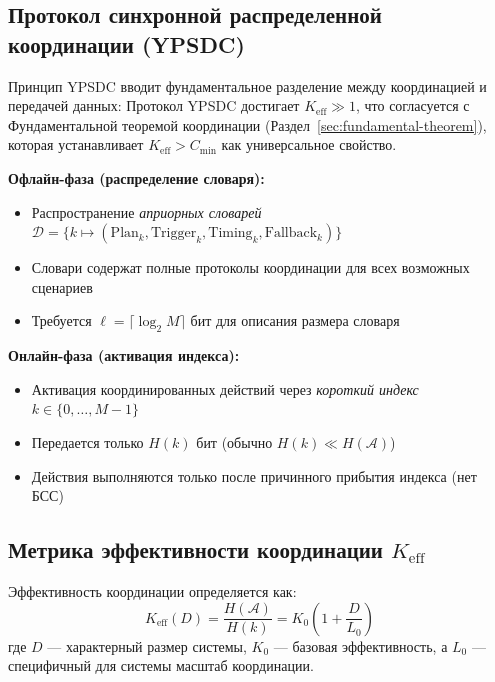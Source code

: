 \documentclass[11pt,a4paper]{article}
\begin{document}
	\subsection{Протокол синхронной распределенной координации (YPSDC)}
	Принцип YPSDC вводит фундаментальное разделение между координацией и передачей данных:
	Протокол YPSDC достигает $K_{\mathrm{eff}} \gg 1$, что согласуется с Фундаментальной теоремой координации (Раздел~\ref{sec:fundamental-theorem}), которая устанавливает $K_{\mathrm{eff}} > C_{\min}$ как универсальное свойство.
	\begin{tcolorbox}[title=Принцип YPSDC, colback=blue!5!white, colframe=blue!50!black]
		\textbf{Офлайн-фаза (распределение словаря):}
		\begin{itemize}
			\item Распространение \emph{априорных словарей} $\mathcal{D} = \{k \mapsto (\text{Plan}_k, \text{Trigger}_k, \text{Timing}_k, \text{Fallback}_k)\}$
			\item Словари содержат полные протоколы координации для всех возможных сценариев
			\item Требуется $\ell = \lceil \log_2 M \rceil$ бит для описания размера словаря
		\end{itemize}
		
		\textbf{Онлайн-фаза (активация индекса):}
		\begin{itemize}
			\item Активация координированных действий через \emph{короткий индекс} $k \in \{0, \dots, M-1\}$
			\item Передается только $H(k)$ бит (обычно $H(k) \ll H(\mathcal{A})$)
			\item Действия выполняются только после причинного прибытия индекса (нет БСС)
		\end{itemize}
	\end{tcolorbox}
	
	\subsection{Метрика эффективности координации \texorpdfstring{$K_{\mathrm{eff}}$}{K_eff}}
	Эффективность координации определяется как:
	\begin{equation}
		K_{\mathrm{eff}}(D) = \frac{H(\mathcal{A})}{H(k)} = K_0 \left(1 + \frac{D}{L_0}\right)
	\end{equation}
	где $D$ — характерный размер системы, $K_0$ — базовая эффективность, 
	а $L_0$ — специфичный для системы масштаб координации.
	
\end{document}
